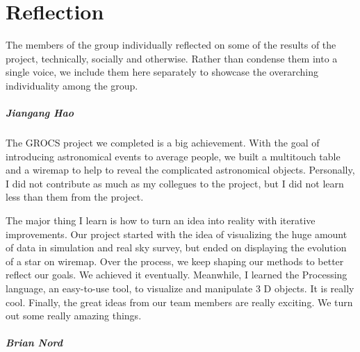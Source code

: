 \chapter{Reflection}
The members of the group individually reflected on some of the results of the project, technically, socially and otherwise.  Rather than condense them into a single voice, we include them here separately to showcase the overarching individuality among the group. 

\paragraph{Jiangang Hao}
The GROCS project we completed is a big achievement. With the goal of introducing astronomical events to average people, we built a multitouch table and a wiremap to help to reveal the complicated astronomical objects. Personally, I did not contribute as much as my collegues to the project, but I did not learn less than them from the project.

The major thing I learn is how to turn an idea into reality with iterative improvements. Our project started with the idea of visualizing the huge amount of data in simulation and real sky survey, but ended on displaying the evolution of a star on wiremap. Over the process, we keep shaping our methods to better reflect our goals. We achieved it eventually. Meanwhile, I learned the Processing language, an easy-to-use tool, to visualize and manipulate 3 D objects. It is really cool. Finally, the great ideas from our team members are really exciting. We turn out some really amazing things.

\paragraph{Brian Nord}


